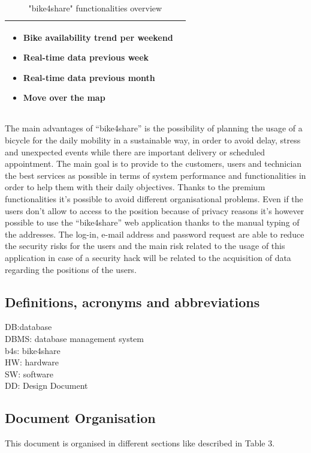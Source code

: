 \documentclass{article}
\begin{document}
\begin{table} [H]
\begin{center}
\begin{tabular}{|l|p{}|}
\begin{itemize}
                               \item Bike availability trend per weekend
                               \item Real-time data previous week
                               \item Real-time data previous month
                               \item Move over the map
                               \end{itemize}
                \\
            \hline
        \end{tabular}
    \end{center}
\caption{"bike4share" functionalities overview}
\end{table}
The main advantages of “bike4share” is the possibility of planning the usage of a bicycle for the daily mobility in a sustainable way, in order to avoid delay, stress and unexpected events while there are important delivery or scheduled appointment.
The main goal is to provide to the customers, users and technician the best services as possible in terms of system performance and functionalities in order to help them with their daily objectives.
Thanks to the premium functionalities it’s possible to avoid different organisational problems. 
Even if the users don’t allow to access to the position because of privacy reasons it’s however possible to use the “bike4share” web application thanks to the manual typing of the addresses.  
The log-in, e-mail address and password request are able to reduce the security risks for the users and the main risk related to the usage of this application in case of a security hack will be related to the acquisition of data regarding the positions of the users.
\subsection{Definitions, acronyms and abbreviations}
DB:database\\
DBMS: database management system\\
b4s: bike4share\\
HW: hardware\\
SW: software\\
DD: Design Document
\subsection{Document Organisation}
This document is organised in different sections like described in Table 3.
\end{document}
